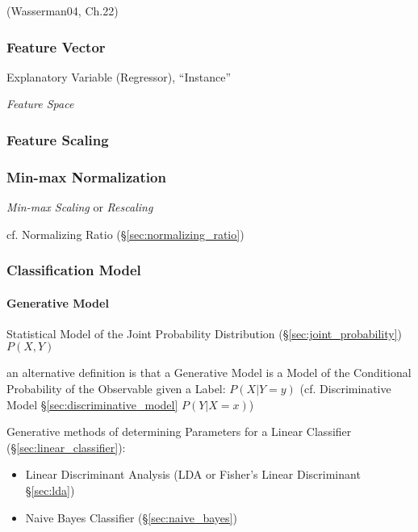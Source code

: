 (Wasserman04, Ch.22)



\subsubsection{Feature Vector}\label{sec:feature_vector}

Explanatory Variable (Regressor), ``Instance''

\emph{Feature Space}



\subsubsection{Feature Scaling}\label{sec:feature_scaling}

\subsubsection{Min-max Normalization}\label{sec:minmax_normalization}

\emph{Min-max Scaling} or \emph{Rescaling}

\fist cf. Normalizing Ratio (\S\ref{sec:normalizing_ratio})



\subsubsection{Classification Model}\label{sec:classification_model}

\paragraph{Generative Model}\label{sec:generative_model}\hfill

Statistical Model of the Joint Probability Distribution
(\S\ref{sec:joint_probability}) $P(X,Y)$

an alternative definition is that a Generative Model is a Model of the
Conditional Probability of the Observable given a Label: $P(X|Y = y)$
(cf. Discriminative Model \S\ref{sec:discriminative_model} $P(Y|X = x)$)

Generative methods of determining Parameters for a Linear Classifier
(\S\ref{sec:linear_classifier}):
\begin{itemize}
  \item Linear Discriminant Analysis (LDA or Fisher's Linear Discriminant
    \S\ref{sec:lda})
  \item Naive Bayes Classifier (\S\ref{sec:naive_bayes})
\end{itemize}

